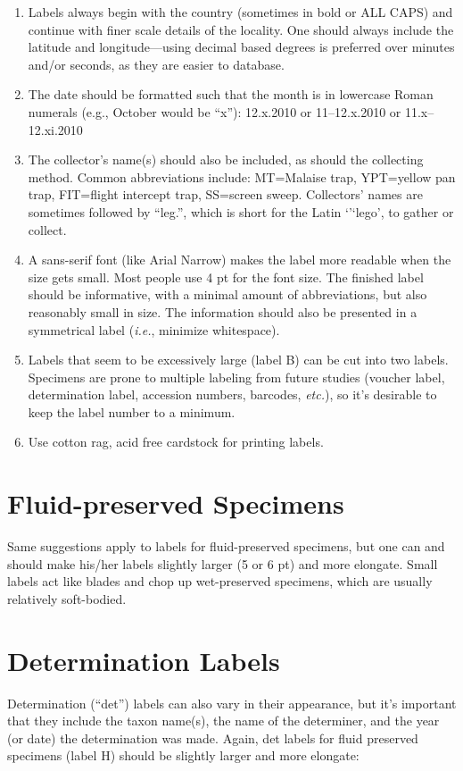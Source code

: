 \documentclass[letterpaper, 11pt]{article}
\begin{document}
\begin{enumerate}
\item Labels always begin with the country (sometimes in bold or ALL CAPS) and continue with finer scale details of the locality. One should always include the latitude and longitude---using decimal based degrees is preferred over minutes and/or seconds, as they are easier to database.
\item The date should be formatted such that the month is in lowercase Roman numerals (e.g., October would be ``x''): 12.x.2010 or 11--12.x.2010 or 11.x--12.xi.2010
\item The collector’s name(s) should also be included, as should the collecting method. Common abbreviations include: MT=Malaise trap, YPT=yellow pan trap, FIT=flight intercept trap, SS=screen sweep. Collectors’ names are sometimes followed by ``leg.'', which is short for the Latin `'`lego', to gather or collect.
\item A sans-serif font (like Arial Narrow) makes the label more readable when the size gets small. Most people use 4 pt for the font size. The finished label should be informative, with a minimal amount of abbreviations, but also reasonably small in size. The information should also be presented in a symmetrical label (\textit{i.e.}, minimize whitespace).
\item Labels that seem to be excessively large (label B) can be cut into two labels. Specimens are prone to multiple labeling from future studies (voucher label, determination label, accession numbers, barcodes, \textit{etc.}), so it's desirable to keep the label number to a minimum.
\item Use cotton rag, acid free cardstock for printing labels.
\end{enumerate}

\section*{Fluid-preserved Specimens}%
Same suggestions apply to labels for fluid-preserved specimens, but one can and should make his/her labels slightly larger (5 or 6 pt) and more elongate. Small labels act like blades and chop up wet-preserved specimens, which are usually relatively soft-bodied.

\section*{Determination Labels}
Determination (``det'') labels can also vary in their appearance, but it’s important that they include the taxon name(s), the name of the determiner, and the year (or date) the determination was made. Again, det labels for fluid preserved specimens (label H) should be slightly larger and more elongate:
\end{document}
